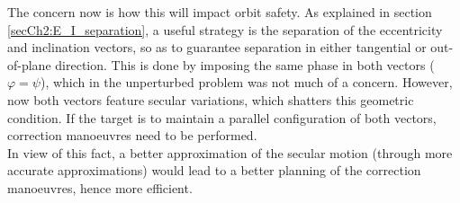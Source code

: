 	\FloatBarrier
 	\indent The concern now is how this will impact orbit safety. As explained in section \ref{secCh2:E_I_separation}, a useful strategy is the separation of the eccentricity and inclination vectors, so as to guarantee separation in either tangential or out-of-plane direction. This is done by imposing the same phase in both vectors ($\varphi = \psi$), which in the unperturbed problem was not much of a concern. However, now both vectors feature secular variations, which shatters this geometric condition. If the target is to maintain a parallel configuration of both vectors, correction manoeuvres need to be performed.\\
 	\indent In view of this fact, a better approximation of the secular motion (through more accurate approximations) would lead to a better planning of the correction manoeuvres, hence more efficient.
%
	
